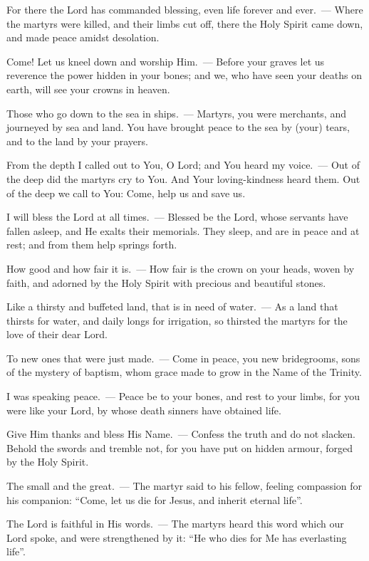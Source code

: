 \documentclass[12pt,twoside,a5paper]{article}
\begin{document}
\begin{halfparskip}
  For there the Lord has commanded blessing, even life forever and ever.~--- Where the martyrs were killed, and their limbs cut off, there the Holy Spirit came down, and made peace amidst desolation.

  Come! Let us kneel down and worship Him.~--- Before your graves let us reverence the power hidden in your bones; and we, who have seen your deaths on earth, will see your crowns in heaven.

  Those who go down to the sea in ships.~--- Martyrs, you were merchants, and journeyed by sea and land. You have brought peace to the sea by (your) tears, and to the land by your prayers.

  From the depth I called out to You, O Lord; and You heard my voice.~--- Out of the deep did the martyrs cry to You. And Your loving-kindness heard them. Out of the deep we call to You: Come, help us and save us.

  I will bless the Lord at all times.~--- Blessed be the Lord, whose servants have fallen asleep, and He exalts their memorials. They sleep, and are in peace and at rest; and from them help springs forth.

  How good and how fair it is.~--- How fair is the crown on your heads, woven by faith, and adorned by the Holy Spirit with precious and beautiful stones.

  Like a thirsty and buffeted land, that is in need of water.~--- As a land that thirsts for water, and daily longs for irrigation, so thirsted the martyrs for the love of their dear Lord.

  To new ones that were just made.~--- Come in peace, you new bridegrooms, sons of the mystery of baptism, whom grace made to grow in the Name of the Trinity.

  I was speaking peace.~--- Peace be to your bones, and rest to your limbs, for you were like your Lord, by whose death sinners have obtained life.

  Give Him thanks and bless His Name.~--- Confess the truth and do not slacken. Behold the swords and tremble not, for you have put on hidden armour, forged by the Holy Spirit.

  The small and the great.~--- The martyr said to his fellow, feeling compassion for his companion: ``Come, let us die for Jesus, and inherit eternal life''.

  The Lord is faithful in His words.~--- The martyrs heard this word which our Lord spoke, and were strengthened by it: ``He who dies for Me has everlasting life''.


\end{halfparskip}
\end{document}
